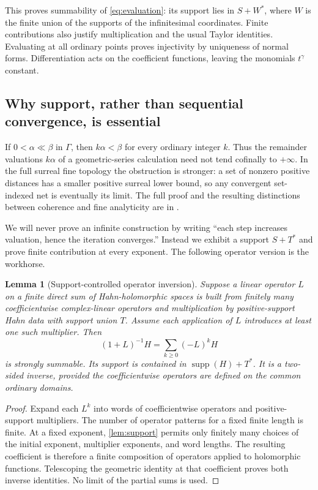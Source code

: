 \documentclass[11pt,letterpaper]{article}
\newtheorem{lemma}[theorem]{Lemma}
\theoremstyle{definition}
\theoremstyle{remark}
\newcommand{\supp}{\operatorname{supp}}
\numberwithin{equation}{section}
\begin{document}
This proves summability of \eqref{eq:evaluation}: its support lies in $S+W^*$, where $W$ is the finite union of the supports of the infinitesimal coordinates. Finite contributions also justify multiplication and the usual Taylor identities. Evaluating at all ordinary points proves injectivity by uniqueness of normal forms. Differentiation acts on the coefficient functions, leaving the monomials $t^\gamma$ constant.

\subsection{Why support, rather than sequential convergence, is essential}
If $0<\alpha\ll\beta$ in $\Gamma$, then $k\alpha<\beta$ for every ordinary integer $k$. Thus the remainder valuations $k\alpha$ of a geometric-series calculation need not tend cofinally to $+\infty$. In the full surreal fine topology the obstruction is stronger: a set of nonzero positive distances has a smaller positive surreal lower bound, so any convergent set-indexed net is eventually its limit. The full proof and the resulting distinctions between coherence and fine analyticity are in \cite{Supplied}.

We will never prove an infinite construction by writing ``each step increases valuation, hence the iteration converges.'' Instead we exhibit a support $S+T^*$ and prove finite contribution at every exponent. The following operator version is the workhorse.

\begin{lemma}[Support-controlled operator inversion]\label{lem:operator}
Suppose a linear operator $L$ on a finite direct sum of Hahn-holomorphic spaces is built from finitely many coefficientwise complex-linear operators and multiplication by positive-support Hahn data with support union $T$. Assume each application of $L$ introduces at least one such multiplier. Then
\[
 (1+L)^{-1}H=\sum_{k\ge0}(-L)^kH
\]
is strongly summable. Its support is contained in $\supp(H)+T^*$. It is a two-sided inverse, provided the coefficientwise operators are defined on the common ordinary domains.
\end{lemma}
\begin{proof}
Expand each $L^k$ into words of coefficientwise operators and positive-support multipliers. The number of operator patterns for a fixed finite length is finite. At a fixed exponent, \cref{lem:support} permits only finitely many choices of the initial exponent, multiplier exponents, and word lengths. The resulting coefficient is therefore a finite composition of operators applied to holomorphic functions. Telescoping the geometric identity at that coefficient proves both inverse identities. No limit of the partial sums is used.
\end{proof}
\end{document}

